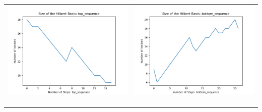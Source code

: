 \documentclass[10pt]{article}
\begin{document}
\begin{tabular}{c|c}
\begin{minipage}{.45\textwidth}
\includegraphics[width=\textwidth]{"DATA/4d/5 generators 2 bound I/top_sequence SIZE"}
\end{minipage} &
\begin{minipage}{.45\textwidth}
\includegraphics[width=\textwidth]{"DATA/4d/5 generators 2 bound I bottomup/bottom_sequence SIZE"}
\end{minipage} \\ \\
\hline \\\begin{minipage}{.45\textwidth}

\end{minipage}
\end{tabular}
\end{document}
